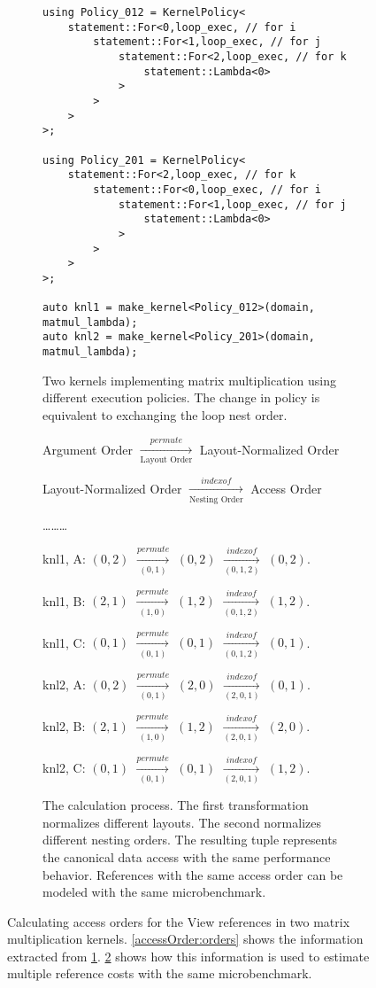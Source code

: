 \begin{figure*}
\begin{subfigure}[b]{0.40\textwidth}
\begin{lstlisting}
using Policy_012 = KernelPolicy< 
	statement::For<0,loop_exec, // for i
		statement::For<1,loop_exec, // for j
			statement::For<2,loop_exec, // for k
				statement::Lambda<0>
			>
		>
	>
>;

using Policy_201 = KernelPolicy< 
	statement::For<2,loop_exec, // for k
		statement::For<0,loop_exec, // for i
			statement::For<1,loop_exec, // for j
				statement::Lambda<0>
			>
		>
	>
>;

auto knl1 = make_kernel<Policy_012>(domain, matmul_lambda);
auto knl2 = make_kernel<Policy_201>(domain, matmul_lambda);
		\end{lstlisting}
		\caption{Two kernels implementing matrix multiplication using different execution policies. The change in policy is equivalent to exchanging the loop nest order.}
		\label{accessOrder:code}
	\end{subfigure}
	\hspace{0.02\textwidth}
	\begin{subfigure}[b]{0.45\textwidth}
		\begin{center}
		Argument Order $\xrightarrow[\text{Layout Order}]{permute}$ Layout-Normalized Order

		Layout-Normalized Order $\xrightarrow[\text{Nesting Order}]{indexof}$ Access Order

		\vspace{5px}
		\dots\dots\dots
		\vspace{5px}

		knl1, A: $(0,2)$ $\xrightarrow[(0,1)]{permute}$ $(0,2)$ $\xrightarrow[(0,1,2)]{indexof}$ $(0,2)$.
		
		knl1, B: $(2,1)$ $\xrightarrow[(1,0)]{permute}$ $(1,2)$ $\xrightarrow[(0,1,2)]{indexof}$ $(1,2)$.
		
		knl1, C: $(0,1)$ $\xrightarrow[(0,1)]{permute}$ $(0,1)$ $\xrightarrow[(0,1,2)]{indexof}$ $(0,1)$.
		
		knl2, A: $(0,2)$ $\xrightarrow[(0,1)]{permute}$ $(2,0)$ $\xrightarrow[(2,0,1)]{indexof}$ $(0,1)$.

		knl2, B: $(2,1)$ $\xrightarrow[(1,0)]{permute}$ $(1,2)$ $\xrightarrow[(2,0,1)]{indexof}$ $(2,0)$.

		knl2, C: $(0,1)$ $\xrightarrow[(0,1)]{permute}$ $(0,1)$ $\xrightarrow[(2,0,1)]{indexof}$ $(1,2)$.
	\end{center}
	\caption{The calculation process. The first transformation normalizes different layouts. The second normalizes different nesting orders. The resulting tuple represents the canonical data access with the same performance behavior. References with the same access order can be modeled with the same microbenchmark.}
	\label{accessOrder:calc}
	\end{subfigure}

	
	\caption{Calculating access orders for the View references in two matrix multiplication kernels. \ref{accessOrder:orders} shows the information extracted from \ref{accessOrder:code}. \ref{accessOrder:calc} shows how this information is used to estimate multiple reference costs with the same microbenchmark. }
	\label{accessOrder}

\end{figure*}


